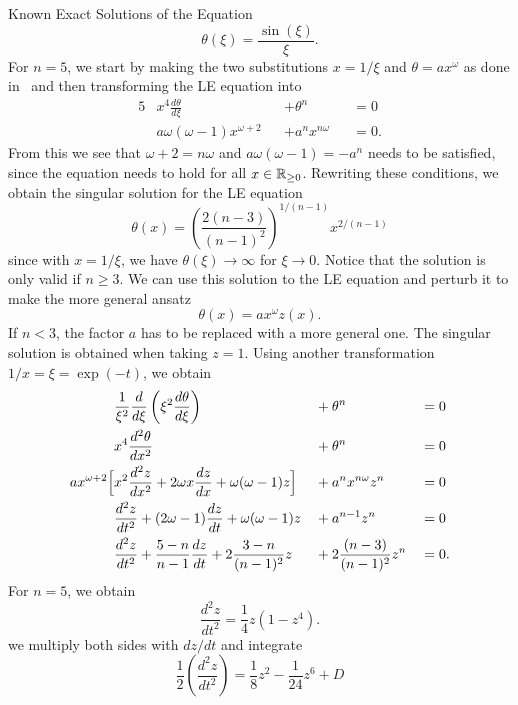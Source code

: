 \begin{appendix}
\begin{section}
\begin{subsection}{Known Exact Solutions of the \texorpdfstring{}{LE} Equation}
\begin{equation}
	\theta(\xi) = \frac{\sin(\xi)}{\xi}.
\end{equation}
For $n=5$, we start by making the two substitutions $x=1/\xi$ and $\theta=ax^\omega$ as done in~\cite[94\psqq]{chandrasekharChandrasekharAnIntroductionStudy1958} and then transforming the \ac{LE} equation into
\begin{alignat}{5}
	&x^4\frac{d\theta}{d\xi}&&+\theta^n&&=0\\
	&a\omega(\omega-1)x^{\omega+2}&&+a^nx^{n\omega} &&=0.
\end{alignat}
From this we see that $\omega+2=n\omega$ and $a\omega(\omega-1)=-a^n$ needs to be satisfied, since the equation needs to hold for all $x\in\mathbb{R}_{\geq0}$.
Rewriting these conditions, we obtain the singular solution for the \ac{LE} equation
\begin{equation}
	\theta(x) = \left(\frac{2(n-3)}{(n-1)^2}\right)^{1/(n-1)}x^{2/(n-1)}
\end{equation}
since with $x=1/\xi$, we have $\theta(\xi)\rightarrow\infty$ for $\xi\rightarrow0$.
Notice that the solution is only valid if $n\geq3$.
We can use this solution to the \ac{LE} equation and perturb it to make the more general ansatz
\begin{equation}
	\theta(x) = ax^\omega z(x).
\end{equation}
If $n<3$, the factor $a$ has to be replaced with a more general one.
The singular solution is obtained when taking $z=1$.
Using another transformation $1/x=\xi=\exp(-t)$, we obtain
\begin{alignat}{5}
	&\frac{1}{\xi^2}\frac{d}{d\xi}\left(\xi^2\frac{d\theta}{d\xi}\right) &&+ \theta^n &&=0\\
	&x^4\frac{d^2\theta}{dx^2} &&+ \theta^n &&=0\\
	ax^{\omega+2}\Bigl[&x^2\frac{d^2z}{dx^2} + 2\omega x\frac{dz}{dx} + \omega(\omega-1)z\Bigr] &&+ a^nx^{n\omega}z^n &&=0\\
	&\frac{d^2z}{dt^2} + (2\omega-1)\frac{dz}{dt}+\omega(\omega-1)z &&+ a^{n-1}z^n &&=0\\
	&\frac{d^2z}{dt^2} + \frac{5-n}{n-1}\frac{dz}{dt} + 2\frac{3-n}{(n-1)^2}z &&+ 2\frac{(n-3)}{(n-1)^2}z^n &&=0.
\end{alignat}
For $n=5$, we obtain
\begin{equation}
	\frac{d^2z}{dt^2}=\frac{1}{4}z(1-z^4).
\end{equation}
we multiply both sides with $dz/dt$ and integrate
\begin{equation}
	\frac{1}{2}\left(\frac{d^2z}{dt^2}\right) = \frac{1}{8}z^2-\frac{1}{24}z^6+D

\end{equation}
\end{subsection}
\end{section}
\end{appendix}
